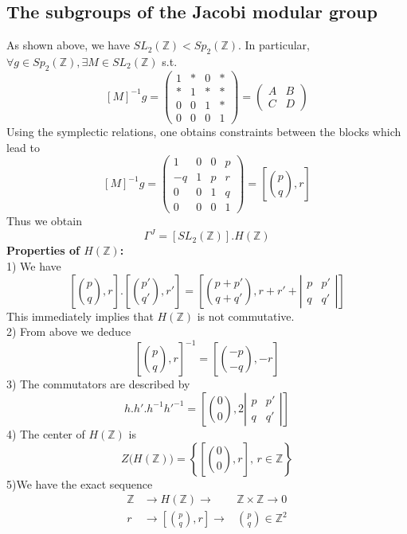 \documentclass[10pt,a4paper]{article}
\begin{document}
\subsection{The subgroups of the Jacobi modular group}
As shown above, we have $SL_2(\mathbb{Z})<Sp_2(\mathbb{Z})$. In particular, $\forall g\in Sp_2(\mathbb{Z}),\exists M\in SL_2(\mathbb{Z})$ s.t. 
\[[M]^{-1}g=\left(\begin{array}{cccc}
1&*&0&* \\ *&1&*&* \\ 0&0&1&* \\ 0&0&0&1
\end{array}\right)=\left(\begin{array}{cc}A & B \\ C & D\end{array}\right)\]
Using the symplectic relations, one obtains constraints between the blocks which lead to
\[[M]^{-1}g=\left(\begin{array}{cccc}
1&0&0&p \\ -q&1&p&r \\ 0&0&1&q \\ 0&0&0&1
\end{array}\right)=\left[\binom{p}{q},r\right]\]
Thus we obtain
\[\Gamma	^J=\left[SL_2(\mathbb{Z})\right].H(\mathbb{Z})\]
\textbf{Properties of $H(\mathbb{Z})$:}\\
1) We have
\[\left[\binom{p}{q},r\right].\left[\binom{p'}{q'},r'\right]=\left[\binom{p+p'}{q+q'},r+r'+\left|\begin{array}{cc}
p&p' \\ q & q'\end{array}\right|\right]\]
This immediately implies that $H(\mathbb{Z})$ is not commutative.\\
2) From above we deduce
\[\left[\binom{p}{q},r\right]^{-1}=\left[\binom{-p}{-q},-r\right]\]
3) The commutators are described by
\[h.h'.h^{-1}h'^{-1}=\left[\binom{0}{0},2\left|\begin{array}{cc}
p&p' \\ q & q'\end{array}\right|\right]\]
4) The center of $H(\mathbb{Z})$ is
\[Z\big(H(\mathbb{Z})\big)=\left\{\left[\binom{0}{0},r\right],\, r\in\mathbb{Z}\right\}\]
5)We have the exact sequence
\begin{eqnarray*}
\mathbb{Z}&\longrightarrow H(\mathbb{Z})\longrightarrow&\mathbb{Z}\times\mathbb{Z}
\longrightarrow 0\\
r&\longrightarrow\left[\binom{p}{q},r\right]\longrightarrow&\binom{p}{q}\in\mathbb{Z}^2
\end{eqnarray*}
\end{document}
